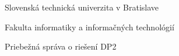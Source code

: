 \begin{center}
\thispagestyle{empty}
{\Large Slovenská technická univerzita v Bratislave}
\par\end{center}{\Large \par}

\begin{center}
{\Large Fakulta informatiky a informačných technológií}
\par\end{center}{\Large \par}

\smallskip{}

\begin{center}

\myEvidenceNumber

\par\end{center}
\vfill{}

\begin{center}
\textbf{\Large \myName}
\par\end{center}{\Large \par}

\medskip{}


\begin{center}
\textbf{\LARGE \myTitle }
\par\end{center}{\huge \par}

\medskip{}


\begin{center}

{\Large Priebežná správa o riešení DP2}

\par\end{center}{\Large \par}

\vfill{}